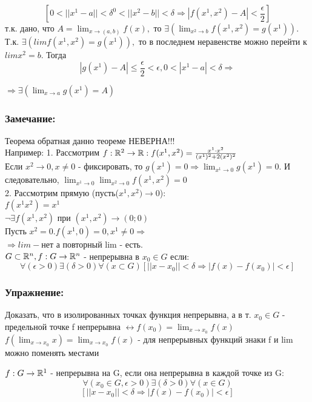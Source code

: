 $$
[0<||x^1-a||<\delta ^ 0<||x^2-b||<\delta\Rightarrow|f(x^1,x^2)-A|<\frac{\epsilon}{2}]
$$
т.к. дано, что $A=\lim_{x\to(a,b)}f(x),$ то $\exists(\lim_{x^2\to b}f(x^1,x^2)=g(x^1)).$
\\
Т.к. $\exists(lim f(x^1,x^2)=g(x^1)),$ то в последнем неравенстве можно перейти к $lim x^2=b.$ Тогда
$$
|g(x^1)-A|\le\frac{\epsilon}{2}<\epsilon, 0<|x^1-a|<\delta\Rightarrow
$$

$\Rightarrow \exists(\lim_{x\to a}g(x^1)=A)$
\dokno

\subsubsection{Замечание:}
Теорема обратная данно теореме НЕВЕРНА!!!
\\
Например:
1. Рассмотрим $f:\mathbb{R}^2\to\mathbb{R}:f(x^1,x^2)=\frac{x^1\cdot x^2}{(x^1)^2+2(x^2)^2}$
\\
Если $x^2\to 0, x\ne 0$ - фиксировать, то $g(x^1)=0\Rightarrow \lim_{x^1\to 0}g(x^1)=0.$ И следовательно, $\lim_{x^1\to 0}\lim_{x^2\to 0}f(x^1,x^2)=0$
\\
2. Рассмотрим прямую (пусть($x^1,x^2)\to 0$):
\\
$f(x^1x^2)=x^1$
\\
$\neg\exists f(x^1,x^2)$ при $(x^1,x^2)\to(0;0)$
\\
Пусть $x^2=0. f(x^1,0)=0, x^1\ne 0\Rightarrow$
\\
$\Rightarrow lim - $нет а повторный lim - есть.
\\
$G\subset\mathbb{R}^n, f:G\to\mathbb{R}^n$ - непрерывна в $x_0\in G$ если:
$$
\forall(\epsilon>0)\exists(\delta>0)\forall(x\subset G)[||x-x_0||<\delta\Rightarrow |f(x)-f(x_0)|<\epsilon]
$$

\subsubsection{Упражнение:}
Доказать, что в изолированных точках функция непрерывна, а в т. $x_0\in G$ - предельной точке f непрерывна $\leftrightarrow f(x_0)=\lim_{x\to x_0}f(x)$
\\
$f(\lim_{x\to x_0}x)=\lim_{x\to x_0}f(x)$ - для непрерывных функций знаки f и lim можно поменять местами

\begin{opred}
$f:G\to\mathbb{R}^1$ - непрерывна на G, если она непрерывна в каждой точке из G:
$$
\forall(x_0\in G, \epsilon>0)\exists(\delta>0)\forall(x\in G)
$$
$$
[||x-x_0||<\delta\Rightarrow|f(x)-f(x_0)|<\epsilon]
$$

\end{opred}

